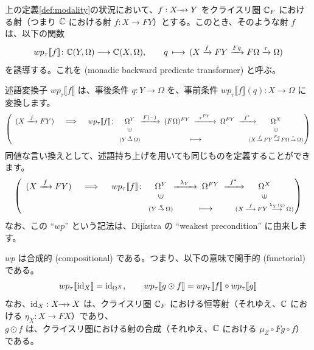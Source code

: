 \documentclass[
		head_space=20mm,
		foot_space=20mm,
		gutter=10mm,
		line_length=190mm
]{jlreq}
\begin{document}
\begin{definition}[モナド的な後ろ向き述語変換子意味論]
	上の定義\ref{def:modality}の状況において、$f:X\computationrightarrow Y$ をクライスリ圏 $\mathbb{C}_F$ における射（つまり $\mathbb{C}$ における射 $f:X\to FY$）とする。このとき、そのような射 $f$ は、以下の関数
	\[wp_\tau\llbracket f\rrbracket\colon\mathbb{C}(Y,\Omega)\longrightarrow\mathbb{C}(X,\Omega),\qquad q\,\longmapsto\,(X\xrightarrow{f}FY\xrightarrow{Fq}F\Omega\xrightarrow{\tau}\Omega)\] 
	を誘導する。これを (monadic backward predicate transformer) と呼ぶ。
\end{definition}

\noindent 述語変換子 $wp_\tau\llbracket f \rrbracket$ は、事後条件 $q\colon Y\to\Omega$ を、事前条件 $wp_\tau\llbracket f \rrbracket(q)\colon X\to\Omega$ に変換します。
\[\left(\begin{array}{cccccc} (X\xrightarrow{\;f\;}FY) &\;\implies\; & wp_\tau\llbracket f\rrbracket\colon \!\!\!& \Omega^Y & \!\!\!\!\!\!\xrightarrow{\,F(-)\,} \; (F\Omega)^{FY} \; \xrightarrow{\;\;\tau^{FY}\;\;} \; \Omega^{FY} \; \xrightarrow{\;\;f^\ast\;\;}\!\!\!\!\!\!\!\!\!\!&\Omega^X\\ &&& \rotatebox{90}{$\in$}&&\rotatebox{90}{$\in$}\\&&&\scriptstyle(Y\,\overset{q}{\to}\,\Omega)& \longmapsto & \scriptstyle \!\!\!(X \,\overset{f}{\to}\, FY \,\overset{Fq}{\to}\, F\Omega \,\overset{\tau}{\to}\, \Omega)\!\!\! \end{array}\right)\]
同値な言い換えとして、述語持ち上げを用いても同じものを定義することができます。
\[\left(\begin{array}{cccccc} (X\xrightarrow{\;f\;}FY) &\;\implies\; & wp_\tau\llbracket f\rrbracket\colon \!\!\!& \Omega^Y & \!\!\!\!\!\! \xrightarrow{~\;\lambda_Y\;~}\; \Omega^{FY} \; \xrightarrow{\;\;f^\ast\;\;}\!\!\!\!\!\!\!\!\!\!&\Omega^X\\ &&& \rotatebox{90}{$\in$}&&\rotatebox{90}{$\in$}\\&&&\scriptstyle(Y\,\overset{q}{\to}\,\Omega)& \longmapsto & \scriptstyle \!\!\!(X \,\overset{f}{\longrightarrow}\, FY \,\overset{\lambda_Y(q)}{\longrightarrow}\, \Omega)\!\!\! \end{array}\right)\]
なお、この ``$wp$'' という記法は、Dijkstra の ``weakest precondition'' に由来します。

\clearpage

\begin{proposition}[合成性]
	$wp$ は合成的 (compositional) である。つまり、以下の意味で関手的 (functorial) である。
	\[wp_\tau\llbracket \mathrm{id}_X \rrbracket = \mathrm{id}_{\Omega^X},\qquad wp_{\tau}\llbracket g \odot f \rrbracket = wp_{\tau}\llbracket f\rrbracket \circ wp_{\tau}\llbracket g\rrbracket\]
	なお、$\id_X:X\computationrightarrow X$ は、クライスリ圏 $\mathbb{C}_F$ における恒等射（それゆえ、$\mathbb{C}$ における $\eta_X:X\to FX$）であり、\\ $g\odot f$ は、クライスリ圏における射の合成（それゆえ、$\mathbb{C}$ における $\mu_Z\circ Fg\circ f$）である。
\end{proposition}
\end{document}
